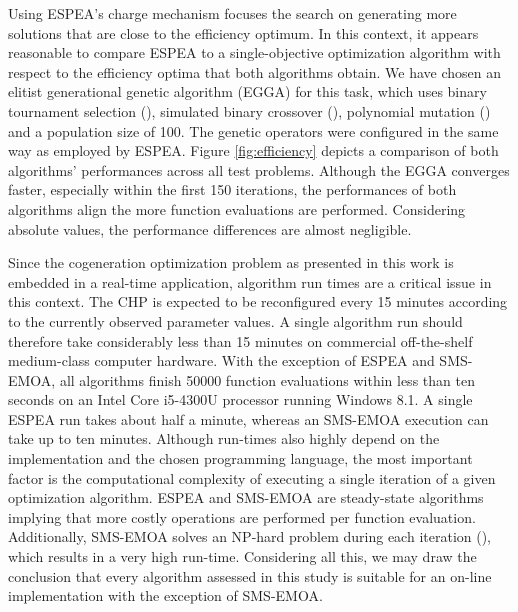Using ESPEA's charge mechanism focuses the search on generating more solutions that are close to the efficiency optimum. In this context, it appears reasonable to compare ESPEA to a single-objective optimization algorithm with respect to the efficiency optima that both algorithms obtain. We have chosen an elitist generational genetic algorithm (EGGA) for this task, which uses binary tournament selection (\cite{goldberg1991comparative}), simulated binary crossover (\cite{sbx}), polynomial mutation (\cite{polynomialmutation}) and a population size of 100. The genetic operators were configured in the same way as employed by ESPEA. Figure \ref{fig:efficiency} depicts a comparison of both algorithms' performances across all test problems. Although the EGGA converges faster, especially within the first 150 iterations, the performances of both algorithms align the more function evaluations are performed. Considering absolute values, the performance differences are almost negligible.

Since the cogeneration optimization problem as presented in this work is embedded in a real-time application, algorithm run times are a critical issue in this context. The CHP is expected to be reconfigured every 15 minutes according to the currently observed parameter values. A single algorithm run should therefore take considerably less than 15 minutes on commercial off-the-shelf medium-class computer hardware. With the exception of ESPEA and SMS-EMOA, all algorithms finish \num{50000} function evaluations within less than ten seconds on an Intel Core i5-4300U processor running Windows 8.1. A single ESPEA run takes about half a minute, whereas an SMS-EMOA execution can take up to ten minutes. Although run-times also highly depend on the implementation and the chosen programming language, the most important factor is the computational complexity of executing a single iteration of a given optimization algorithm. ESPEA and SMS-EMOA are steady-state algorithms implying that more costly operations are performed per function evaluation. Additionally, SMS-EMOA solves an NP-hard problem during each iteration (\cite{hypervolumecontribution}), which results in a very high run-time. Considering all this, we may draw the conclusion that every algorithm assessed in this study is suitable for an on-line implementation with the exception of SMS-EMOA.

